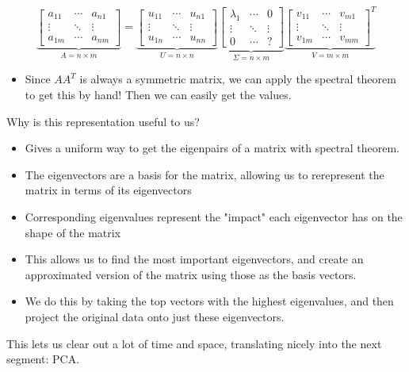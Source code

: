 \documentclass{article}
\begin{document}
    $$\underbrace{\begin{bmatrix}
    a_{11} & \cdots & a_{n1} \\ 
    \vdots & \ddots & \vdots \\ 
    a_{1m} & \cdots & a_{nm}
    \end{bmatrix}}_{A = n\times m} =\underbrace{\begin{bmatrix}
    u_{11} &\cdots & u_{n1} \\
    \vdots & \ddots & \vdots \\ 
    u_{1n} & \cdots & u_{nn}
    \end{bmatrix}}_{U = n\times n} \underbrace{\begin{bmatrix}
    \lambda_1 & \cdots & 0 \\ 
    \vdots  & \ddots & \vdots \\ 
    0  & \cdots & ?
    \end{bmatrix}}_{\Sigma = n\times m} \underbrace{\begin{bmatrix}
    v_{11} &\cdots & v_{m1} \\
    \vdots & \ddots & \vdots \\ 
    v_{1m} & \cdots & v_{mm}
    \end{bmatrix}^T}_{V = m\times m}  $$
\begin{itemize}
    \item Since $AA^T$ is always a symmetric matrix, we can apply the spectral theorem to get this by hand! Then we can easily get the values.
\end{itemize}
Why is this representation useful to us? 
\begin{itemize}
    \item Gives a uniform way to get the eigenpairs of a matrix with spectral theorem.
    \item The eigenvectors are a basis for the matrix, allowing us to rerepresent the matrix in terms of its eigenvectors
    \item Corresponding eigenvalues represent the "impact" each eigenvector has on the shape of the matrix
    \item This allows us to find the most important eigenvectors, and create an approximated version of the matrix using those as the basis vectors.
    \item We do this by taking the top vectors with the highest eigenvalues, and then project the original data onto just these eigenvectors.
\end{itemize}
This lets us clear out a lot of time and space, translating nicely into the next segment: PCA.
\end{document}
